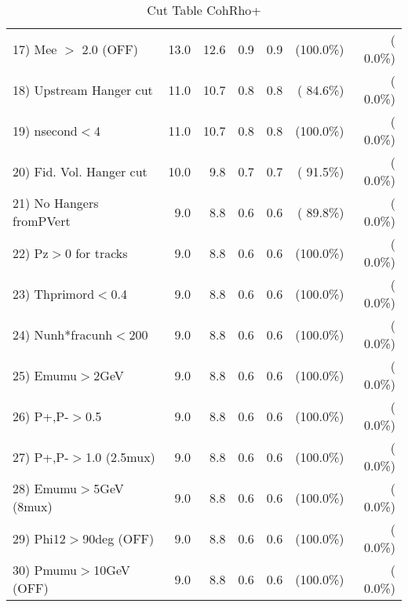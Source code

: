 \begin{table}[h!]
\begin{tabular}{||l||r|r|r|r|r|r||}
 17) Mee $>$ 2.0  (OFF)   &         13.0 &         12.6 &          0.9 &          0.9 & (100.0\%) & (  0.0\%) \\
 18) Upstream Hanger cut  &         11.0 &         10.7 &          0.8 &          0.8 & ( 84.6\%) & (  0.0\%) \\
 19) nsecond$<$4          &         11.0 &         10.7 &          0.8 &          0.8 & (100.0\%) & (  0.0\%) \\
 20) Fid. Vol. Hanger cut &         10.0 &          9.8 &          0.7 &          0.7 & ( 91.5\%) & (  0.0\%) \\
 21) No Hangers fromPVert &          9.0 &          8.8 &          0.6 &          0.6 & ( 89.8\%) & (  0.0\%) \\
 22) Pz$>$0 for tracks    &          9.0 &          8.8 &          0.6 &          0.6 & (100.0\%) & (  0.0\%) \\
 23) Thprimord$<$0.4      &          9.0 &          8.8 &          0.6 &          0.6 & (100.0\%) & (  0.0\%) \\
 24) Nunh*fracunh$<$200   &          9.0 &          8.8 &          0.6 &          0.6 & (100.0\%) & (  0.0\%) \\
 25) Emumu$>$2GeV         &          9.0 &          8.8 &          0.6 &          0.6 & (100.0\%) & (  0.0\%) \\
 26) P+,P-$>$0.5          &          9.0 &          8.8 &          0.6 &          0.6 & (100.0\%) & (  0.0\%) \\
 27) P+,P-$>$1.0 (2.5mux) &          9.0 &          8.8 &          0.6 &          0.6 & (100.0\%) & (  0.0\%) \\
 28) Emumu$>$5GeV  (8mux) &          9.0 &          8.8 &          0.6 &          0.6 & (100.0\%) & (  0.0\%) \\
 29) Phi12$>$90deg  (OFF) &          9.0 &          8.8 &          0.6 &          0.6 & (100.0\%) & (  0.0\%) \\
 30) Pmumu$>$10GeV  (OFF) &          9.0 &          8.8 &          0.6 &          0.6 & (100.0\%) & (  0.0\%) \\
 \hline
 \hline
 \end{tabular}
 \caption{Cut Table  CohRho+  }
 \label{tab-cutcohjpsi-mumu_anumunc}
 \end{table}
